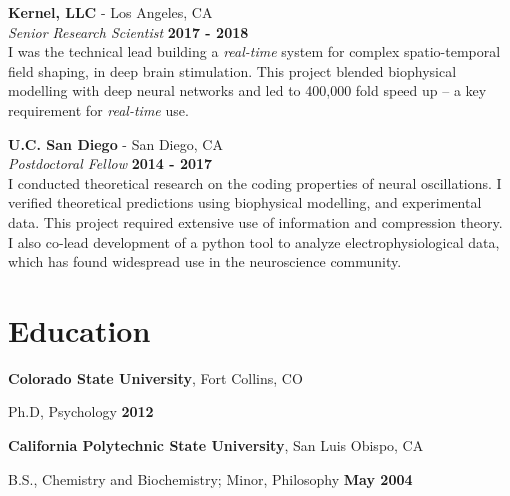 \documentclass[margin,line]{res}
\newenvironment{list1}{
    \begin{list}{\ding{113}}{%
        \setlength{\itemsep}{0in}
        \setlength{\parsep}{0in} \setlength{\parskip}{0in}
        \setlength{\topsep}{0in} \setlength{\partopsep}{0in}
        \setlength{\leftmargin}{0.17in}}}{
    \end{list}}
\begin{document}
\begin{resume}
\vspace{-.2cm}
{\bf Kernel, LLC} - Los Angeles, CA\\
{\em Senior Research Scientist} \hfill {\bf 2017 - 2018}\\
I was the technical lead building a \emph{real-time} system for complex spatio-temporal field shaping, in deep brain stimulation. This project blended biophysical modelling with deep neural networks and led to 400,000 fold speed up -- a key requirement for \emph{real-time} use.

\vspace{-.2cm}
{\bf U.C. San Diego} - San Diego, CA\\
{\em Postdoctoral Fellow} \hfill {\bf 2014 - 2017}\\
I conducted theoretical research on the coding properties of neural oscillations. I verified theoretical predictions using biophysical modelling, and experimental data. This project required extensive use of information and compression theory. I also co-lead development of a python tool to analyze electrophysiological data, which has found widespread use in the neuroscience community.

\vspace{-.2cm}
\section{\sc Education}
{\bf Colorado State University}, Fort Collins, CO\\
\vspace*{-.15in}
\begin{list1}
    \tightlist
    \item[] Ph.D, Psychology \hfill {\bf 2012}
\end{list1}

\vspace*{-.15in}
{\bf California Polytechnic State University}, San Luis Obispo, CA\\
\vspace*{-.15in}
\begin{list1}
    \tightlist
    \item[] B.S., Chemistry and Biochemistry; Minor, Philosophy \hfill {\bf May 2004}
\end{list1}


\vspace{-.1cm}

\end{resume}
\end{document}
